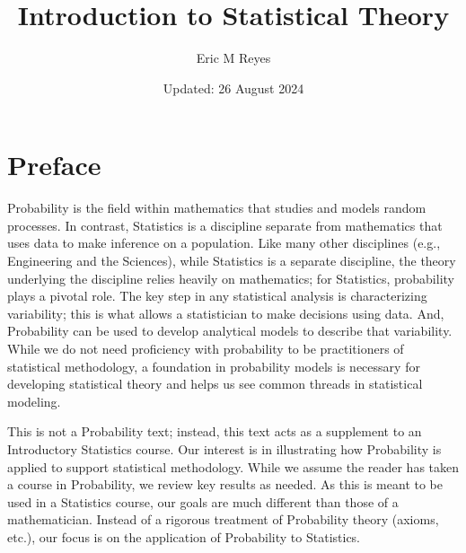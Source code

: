 \documentclass[
  letterpaper,
  DIV=11,
  numbers=noendperiod]{scrreprt}
\title{Introduction to Statistical Theory}
\author{Eric M Reyes}
\date{Updated: 26 August 2024}
\renewcommand*\contentsname{Table of contents}
\newcommand\contentsname{Table of contents}
\theoremstyle{definition}
\theoremstyle{plain}
\theoremstyle{definition}
\theoremstyle{remark}
\begin{document}
\maketitle

\renewcommand*\contentsname{Table of contents}
{
\hypersetup{linkcolor=}
\setcounter{tocdepth}{2}
\tableofcontents
}

\chapter*{Preface}\label{preface}


\providecommand{\norm}[1]{\left\lVert#1\right\rVert}
\providecommand{\abs}[1]{\left\lvert#1\right\rvert}
\providecommand{\dist}[1]{\stackrel{\text{#1}}{\sim}}
\providecommand{\ind}[1]{\mathbb{I}\left(#1\right)}
\providecommand{\bm}[1]{\mathbf{#1}}
\providecommand{\bs}[1]{\boldsymbol{#1}}
\providecommand{\Ell}{\mathcal{L}}
\providecommand{\indep}{\perp\negthickspace\negmedspace\perp}

Probability is the field within mathematics that studies and models
random processes. In contrast, Statistics is a discipline separate from
mathematics that uses data to make inference on a population. Like many
other disciplines (e.g., Engineering and the Sciences), while Statistics
is a separate discipline, the theory underlying the discipline relies
heavily on mathematics; for Statistics, probability plays a pivotal
role. The key step in any statistical analysis is characterizing
variability; this is what allows a statistician to make decisions using
data. And, Probability can be used to develop analytical models to
describe that variability. While we do not need proficiency with
probability to be practitioners of statistical methodology, a foundation
in probability models is necessary for developing statistical theory and
helps us see common threads in statistical modeling.

This is not a Probability text; instead, this text acts as a supplement
to an Introductory Statistics course. Our interest is in illustrating
how Probability is applied to support statistical methodology. While we
assume the reader has taken a course in Probability, we review key
results as needed. As this is meant to be used in a Statistics course,
our goals are much different than those of a mathematician. Instead of a
rigorous treatment of Probability theory (axioms, etc.), our focus is on
the application of Probability to Statistics.
\end{document}
